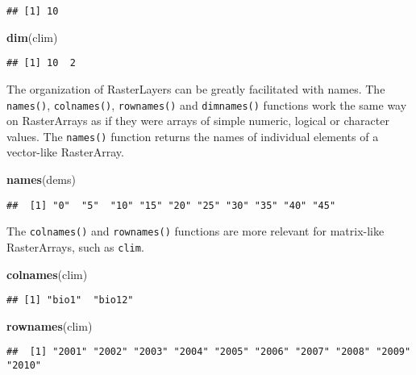\documentclass[]{article}
\newenvironment{Shaded}{\begin{snugshade}}{\end{snugshade}}
\newcommand{\KeywordTok}[1]{\textcolor[rgb]{0.13,0.29,0.53}{\textbf{#1}}}
\newcommand{\NormalTok}[1]{#1}
\begin{document}
\begin{verbatim}
## [1] 10
\end{verbatim}

\begin{Shaded}
\begin{Highlighting}[]
\KeywordTok{dim}\NormalTok{(clim)}
\end{Highlighting}
\end{Shaded}

\begin{verbatim}
## [1] 10  2
\end{verbatim}

The organization of RasterLayers can be greatly facilitated with names.
The \texttt{names()}, \texttt{colnames()}, \texttt{rownames()} and
\texttt{dimnames()} functions work the same way on RasterArrays as if
they were arrays of simple numeric, logical or character values. The
\texttt{names()} function returns the names of individual elements of a
vector-like RasterArray.

\begin{Shaded}
\begin{Highlighting}[]
\KeywordTok{names}\NormalTok{(dems)}
\end{Highlighting}
\end{Shaded}

\begin{verbatim}
##  [1] "0"  "5"  "10" "15" "20" "25" "30" "35" "40" "45"
\end{verbatim}

The \texttt{colnames()} and \texttt{rownames()} functions are more
relevant for matrix-like RasterArrays, such as \texttt{clim}.

\begin{Shaded}
\begin{Highlighting}[]
\KeywordTok{colnames}\NormalTok{(clim)}
\end{Highlighting}
\end{Shaded}

\begin{verbatim}
## [1] "bio1"  "bio12"
\end{verbatim}

\begin{Shaded}
\begin{Highlighting}[]
\KeywordTok{rownames}\NormalTok{(clim)}
\end{Highlighting}
\end{Shaded}

\begin{verbatim}
##  [1] "2001" "2002" "2003" "2004" "2005" "2006" "2007" "2008" "2009" "2010"
\end{verbatim}
\end{document}
